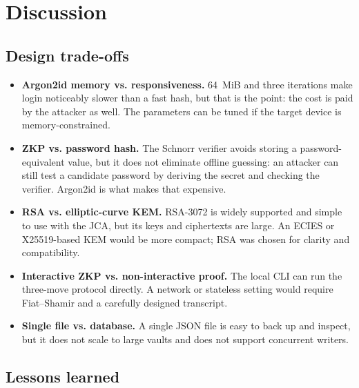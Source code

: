 \documentclass[11pt,a4paper]{article}
\begin{document}
\section{Discussion}\label{sec:discussion}

\subsection{Design trade-offs}

\begin{itemize}[leftmargin=*]
  \item \textbf{Argon2id memory vs. responsiveness.} 64~MiB and three
        iterations make login noticeably slower than a fast hash, but that is
        the point: the cost is paid by the attacker as well. The parameters can
        be tuned if the target device is memory-constrained.
  \item \textbf{ZKP vs. password hash.} The Schnorr verifier avoids storing a
        password-equivalent value, but it does not eliminate offline guessing:
        an attacker can still test a candidate password by deriving the secret
        and checking the verifier. Argon2id is what makes that expensive.
  \item \textbf{RSA vs. elliptic-curve KEM.} RSA-3072 is widely supported and
        simple to use with the JCA, but its keys and ciphertexts are large. An
        ECIES or X25519-based KEM would be more compact; RSA was chosen for
        clarity and compatibility.
  \item \textbf{Interactive ZKP vs. non-interactive proof.} The local CLI can
        run the three-move protocol directly. A network or stateless setting
        would require Fiat--Shamir and a carefully designed transcript.
  \item \textbf{Single file vs. database.} A single JSON file is easy to back
        up and inspect, but it does not scale to large vaults and does not
        support concurrent writers.
\end{itemize}

\subsection{Lessons learned}
\end{document}

